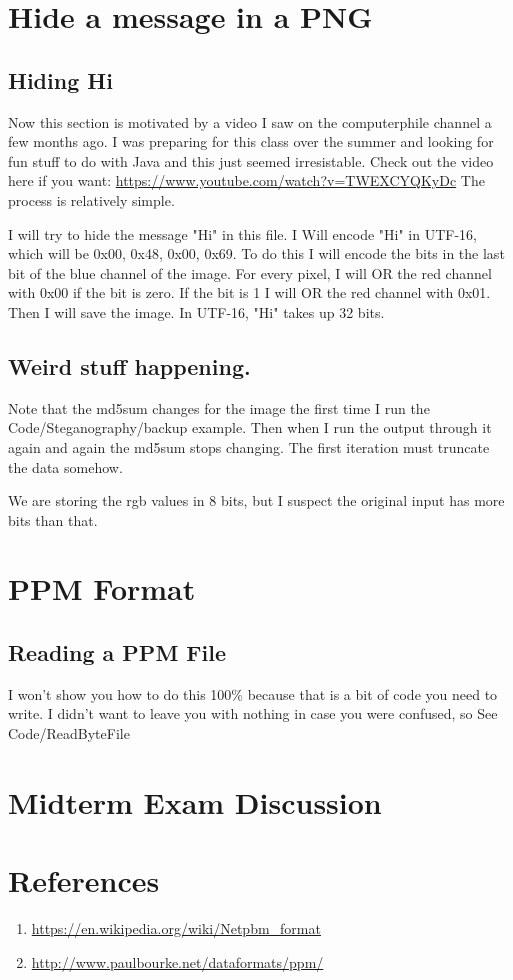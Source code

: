\documentclass[12pt]{article}
\begin{document}
\section{Hide a message in a PNG}

\subsection{Hiding Hi}
Now this section is motivated by a video I saw on the computerphile channel a few months ago. I was preparing for this class over the summer and looking for fun stuff to do with Java and this just seemed irresistable. Check out the video here if you want: \url{https://www.youtube.com/watch?v=TWEXCYQKyDc} The process is relatively simple. 


I will try to hide the message "Hi" in this file. I Will encode "Hi" in UTF-16, which will be 0x00, 0x48, 0x00, 0x69. To do this I will encode the bits in the last bit of the blue channel of the image. For every  pixel, I will OR the red channel with 0x00 if the bit is zero. If the bit is 1 I will OR the red channel with 0x01. Then I will save the image. In UTF-16, "Hi" takes up 32 bits.


\subsection{Weird stuff happening.}
Note that the md5sum changes for the image the first time I run the Code/Steganography/backup example. Then when I run the output through it again and again the md5sum stops changing. The first iteration must truncate the data somehow.

We are storing the rgb values in 8 bits, but I suspect the original input has more bits than that.



\section{PPM Format}

\subsection{Reading a PPM File}

I won't show you how to do this 100\% because that is a bit of code you need to write. I didn't want to leave you with nothing in case you were confused, so See Code/ReadByteFile
\section{Midterm Exam Discussion}

\section{References}
\begin{enumerate}
	\item \url{https://en.wikipedia.org/wiki/Netpbm_format}
	\item \url{http://www.paulbourke.net/dataformats/ppm/}
\end{enumerate}
\end{document}
